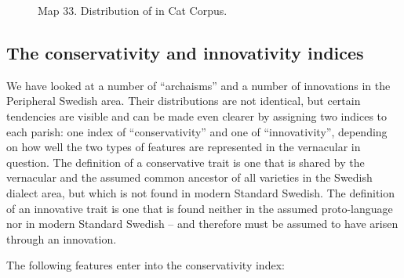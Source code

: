 \begin{figure}[h]
\centering
\begin{minipage}{3.92847in}
Map 33. Distribution of  in Cat Corpus.
\end{minipage}
\end{figure}
\clearpage\subsection[The conservativity and innovativity indices]{\rmfamily The conservativity and innovativity indices}
We have looked at a number of “archaisms” and a number of innovations in the Peripheral Swedish area. Their distributions are not identical, but certain tendencies are visible and can be made even clearer by assigning two indices to each parish: one index of “conservativity” and one of “innovativity”, depending on how well the two types of features are represented in the vernacular in question. The definition of a conservative trait is one that is shared by the vernacular and the assumed common ancestor of all varieties in the Swedish dialect area, but which is not found in modern Standard Swedish. The definition of an innovative trait is one that is found neither in the assumed proto-language nor in modern Standard Swedish – and therefore must be assumed to have arisen through an innovation. 

The following features enter into the conservativity index:


